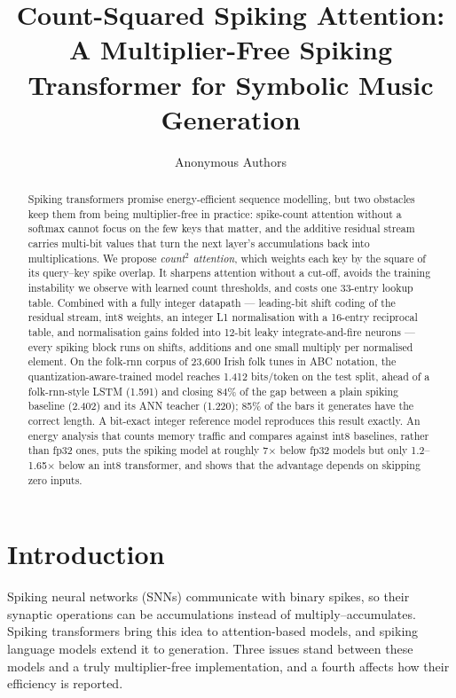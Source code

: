 \documentclass[10pt]{article}
\title{Count-Squared Spiking Attention:\\ A Multiplier-Free Spiking Transformer for Symbolic Music Generation}
\author{Anonymous Authors}
\date{}
\newcommand{\csq}{count$^2$}
\begin{document}
\maketitle

\begin{abstract}
Spiking transformers promise energy-efficient sequence modelling, but two obstacles keep them from being
multiplier-free in practice: spike-count attention without a softmax cannot focus on the few keys that matter, and
the additive residual stream carries multi-bit values that turn the next layer's accumulations back into
multiplications. We propose \emph{\csq{} attention}, which weights each key by the square of its query--key spike
overlap. It sharpens attention without a cut-off, avoids the training instability we observe with learned count
thresholds, and costs one 33-entry lookup table. Combined with a fully integer datapath --- leading-bit shift coding
of the residual stream, int8 weights, an integer L1 normalisation with a 16-entry reciprocal table, and
normalisation gains folded into 12-bit leaky integrate-and-fire neurons --- every spiking block runs on shifts,
additions and one small multiply per normalised element. On the folk-rnn corpus of 23{,}600 Irish folk tunes in ABC
notation, the quantization-aware-trained model reaches 1.412 bits/token on the test split, ahead of a
folk-rnn-style LSTM (1.591) and closing 84\% of the gap between a plain spiking baseline (2.402) and its ANN teacher
(1.220); 85\% of the bars it generates have the correct length. A bit-exact integer reference model reproduces this
result exactly. An energy analysis that counts memory traffic and compares against int8 baselines, rather than
fp32 ones, puts the spiking model at roughly 7$\times$ below fp32 models but only 1.2--1.65$\times$ below an int8
transformer, and shows that the advantage depends on skipping zero inputs.
\end{abstract}

\section{Introduction}

Spiking neural networks (SNNs) communicate with binary spikes, so their synaptic operations can be accumulations
instead of multiply--accumulates. Spiking transformers \citep{zhou2023spikformer, yao2023spikedriven,
zhou2023spikingformer} bring this idea to attention-based models, and spiking language models
\citep{zhu2023spikegpt, wta2026} extend it to generation. Three issues stand between these models and a truly
multiplier-free implementation, and a fourth affects how their efficiency is reported.
\end{document}
